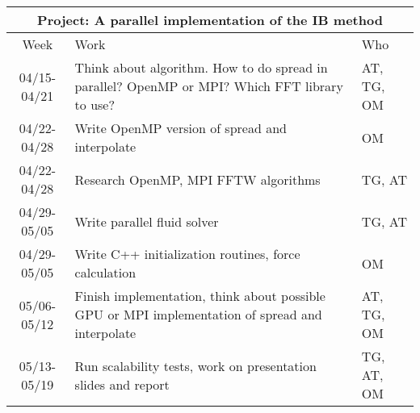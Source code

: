 \documentclass[11pt]{article}
\begin{document}
\begin{enumerate}
\begin{center}
	\begin{tabular} {|c|p{9cm}|p{2cm}|}
		\hline
		\multicolumn{3}{|c|}{\bf Project: A parallel implementation of the IB method} \\
		\hline
		Week & Work & Who  \\ \hline \hline
		04/15-04/21 & Think about
		algorithm. How to do spread in parallel? OpenMP or MPI? Which FFT library to use? &  AT, TG, OM \\ \hline
		04/22-04/28 & Write OpenMP version of spread and interpolate & OM \\ \hline
		04/22-04/28 & Research OpenMP, MPI FFTW algorithms & TG, AT \\ \hline
		04/29-05/05 & Write parallel fluid solver & TG, AT \\ \hline
		04/29-05/05 & Write C++ initialization routines, force calculation & OM \\ \hline
		05/06-05/12 & Finish implementation, think about possible GPU or MPI implementation of spread and interpolate & AT, TG, OM \\ \hline
		05/13-05/19 & Run scalability tests, work on
		presentation slides and report  & TG, AT, OM \\ \hline
	\end{tabular}
\end{center} 














\end{enumerate}
\end{document}
